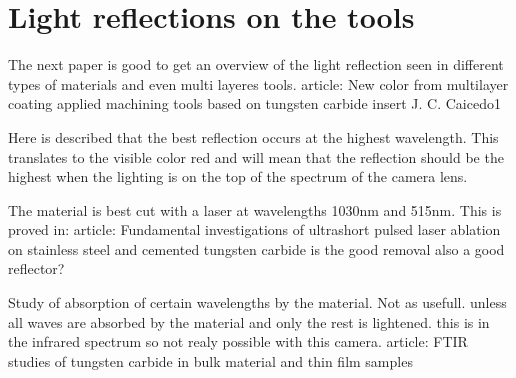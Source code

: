             
\section{Light reflections on the tools}
 The next paper is good to get an overview of the light reflection seen in different types of materials and even multi layeres tools.
	article: New color from multilayer coating applied machining tools based on tungsten carbide insert
	J. C. Caicedo1

Here is described that the best reflection occurs at the highest wavelength. This translates to the visible color red and will mean that the reflection should be the highest when the lighting is on the top of the spectrum of the camera lens. 

The material is best cut with a laser at wavelengths 1030nm and 515nm. This is proved in: 
	article: Fundamental investigations of ultrashort pulsed laser ablation on stainless steel and cemented tungsten carbide
	is the good removal also a good reflector?
		
Study of absorption of certain wavelengths by the material. Not as usefull. unless all waves are absorbed by the material and only the rest is lightened. this is in the infrared spectrum so not realy possible with this camera.
	article: FTIR studies of tungsten carbide in bulk material and thin film samples